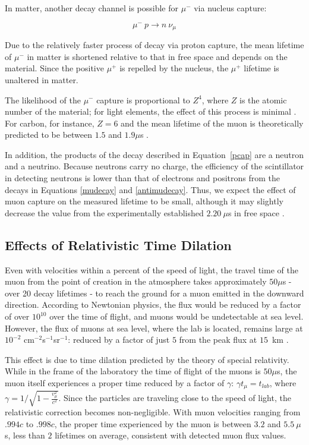 In matter, another decay channel is possible for $\mu^-$ via nucleus
capture:

\begin{equation}\mu^-~p \rightarrow n~\nu_{\mu} \label{pcap} \end{equation}

Due to the relatively faster process of decay via proton capture, the
mean lifetime of $\mu^-$ in matter is shortened relative to that in
free space and depends on the material. Since the positive $\mu^+$ is
repelled by the nucleus, the $\mu^+$ lifetime is unaltered in matter.

The likelihood of the $\mu^-$ capture is proportional to $Z^4$, where
$Z$ is the atomic number of the material; for light elements, the
effect of this process is minimal \cite[p.172]{rossi}. For carbon, for
instance, $Z=6$ and the mean lifetime of the muon is theoretically
predicted to be between $1.5$ and $1.9\mu$s \cite[p.~170]{rossi}.

In addition, the products of the decay described in Equation~\eqref{pcap} are a neutron and a neutrino. Because neutrons carry no
charge, the
efficiency of the scintillator in detecting neutrons is lower than that of
electrons and positrons from the decays in Equations
\eqref{mudecay} and \eqref{antimudecay}.  Thus, we expect the effect of muon capture on the measured
lifetime to be small, although it may slightly decrease the value from
the experimentally established $2.20~\mu$s in free space \cite{pdg}.

\subsection{Effects of Relativistic Time Dilation}

Even with velocities within a percent of the speed of light, the
travel time of the muon from the point of creation in the atmosphere
takes approximately $50\mu$s - over 20 decay lifetimes - to reach the
ground for a muon emitted in the downward direction. According to
Newtonian physics, the flux would be reduced by a factor of over
$10^{10}$ over the time of flight, and muons would be undetectable at
sea level. However, the flux of muons at sea level, where the lab is
located, remains large at $10^{-2}$ cm$^{-2}$s$^{-1}$sr$^{-1}$:
reduced by a factor of just $5$ from the peak flux at $15$~km
\cite{rossi}.

This effect is due to time dilation predicted by the theory of special
relativity. While in the frame of the laboratory the time of flight of
the muons is $50\mu$s, the muon itself experiences a proper time
reduced by a factor of $\gamma$: $ \gamma t_{\mu} = t_{lab}$, where
$\gamma = 1/\sqrt{1 - \frac{v_{\mu}^2}{c^2}}$. Since the particles are
traveling close to the speed of light, the relativistic correction
becomes non-negligible. With muon velocities ranging from $.994c$ to
$.998c$, the proper time experienced by the muon is between $3.2$ and
$5.5~\mu$s, less than $2$ lifetimes on average, consistent with
detected muon flux values.


